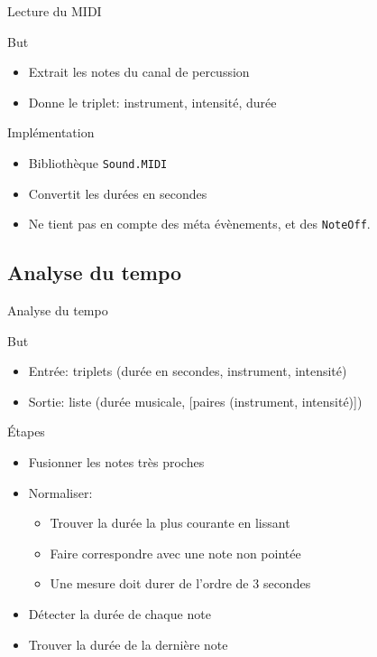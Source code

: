 \documentclass{beamer}
\begin{document}
\begin{frame}[containsverbatim]{Lecture du MIDI}
    \begin{block}{But}
        \begin{itemize}
            \item Extrait les notes du canal de percussion
            \item Donne le triplet: instrument, intensité, durée
        \end{itemize}
    \end{block}

    \begin{block}{Implémentation}
        \begin{itemize}
            \item Bibliothèque \verb+Sound.MIDI+
            \item Convertit les durées en secondes
            \item Ne tient pas en compte des méta évènements, et des
                \verb+NoteOff+.
        \end{itemize}
    \end{block}
\end{frame}

\subsection{Analyse du tempo}

\begin{frame}{Analyse du tempo}
    \begin{block}{But}
        \begin{itemize}
            \item Entrée: triplets (durée en secondes, instrument, intensité)
            \item Sortie: liste (durée musicale,
                [paires (instrument, intensité)])
        \end{itemize}
    \end{block}
    \begin{block}{Étapes}
        \begin{itemize}
            \item Fusionner les notes très proches
            \item Normaliser:
                \begin{itemize}
                    \item Trouver la durée la plus courante en lissant
                    \item Faire correspondre avec une note non pointée
                    \item Une mesure doit durer de l’ordre de 3 secondes
                \end{itemize}
            \item Détecter la durée de chaque note
            \item Trouver la durée de la dernière note
        \end{itemize}
    \end{block}
\end{frame}
\end{document}
